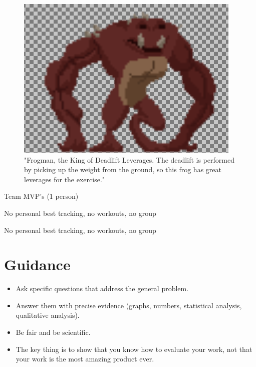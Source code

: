 \documentclass{l4proj}
\begin{document}
\begin{figure}[H]
    \centering
    \includegraphics[width=1.0\linewidth]{froggie.png}    
    \caption{
      "Frogman, the King of Deadlift Leverages. The deadlift is performed by picking up the weight from the ground, so this frog has great leverages for the exercise."
    }
    \label{fig:frogman} 
\end{figure}


Team MVP's (1 person)
  




%



%
%
%  
%
%
%





No personal best tracking, no workouts, no group

No personal best tracking, no workouts, no group


\section{Guidance}
\begin{itemize}
    \item
        Ask specific questions that address the general problem.
    \item
        Answer them with precise evidence (graphs, numbers, statistical
        analysis, qualitative analysis).
    \item
        Be fair and be scientific.
    \item
        The key thing is to show that you know how to evaluate your work, not
        that your work is the most amazing product ever.
\end{itemize}
\end{document}
